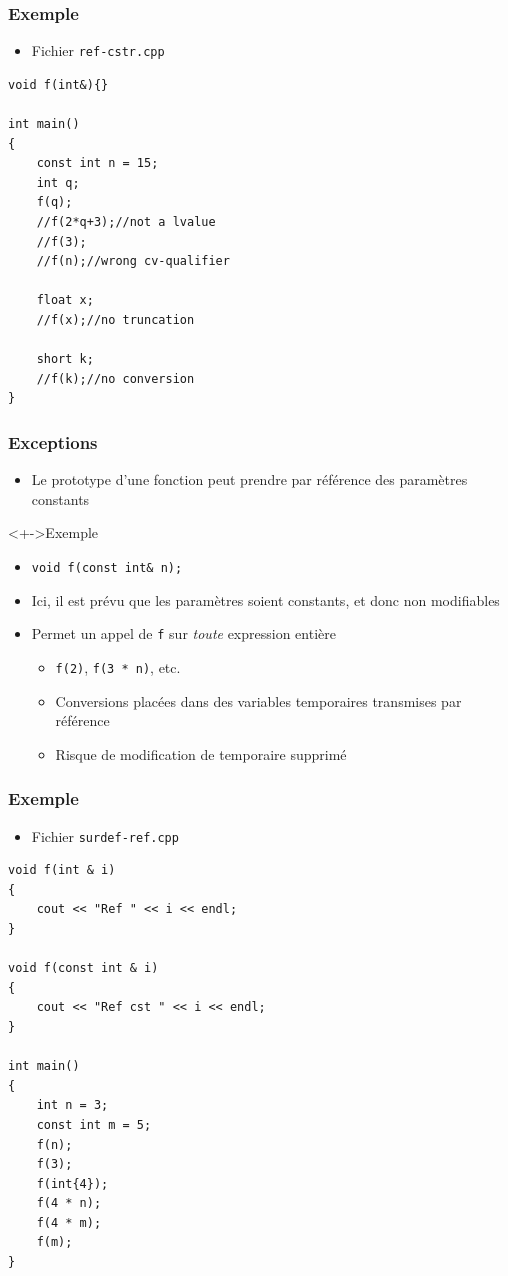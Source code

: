 \begin{frame}[containsverbatim]
\frametitle{Exemple}
\begin{itemize}
\item Fichier \texttt{ref-cstr.cpp}
\end{itemize}
\begin{lstlisting}
void f(int&){}

int main()
{
	const int n = 15;
	int q;
	f(q);
	//f(2*q+3);//not a lvalue
	//f(3);
	//f(n);//wrong cv-qualifier

	float x;
	//f(x);//no truncation

	short k;
	//f(k);//no conversion
}
\end{lstlisting}
\end{frame}

\begin{frame}
\frametitle{Exceptions}
\begin{itemize}[<+->]
\item Le prototype d'une fonction peut prendre par référence des paramètres constants
\end{itemize}
\begin{exampleblock}<+->{Exemple}
	\begin{itemize}[<+->]
	\item \lstinline|void f(const int& n);|
	\end{itemize}
\end{exampleblock}
\begin{itemize}[<+->]
\item Ici, il est prévu que les paramètres soient constants, et donc non modifiables
\item Permet un appel de \texttt{f} sur \emph{toute} expression entière
	\begin{itemize}
	\item \texttt{f(2)}, \texttt{f(3 * n)}, etc.
	\item Conversions placées dans des variables temporaires transmises par référence
	\item Risque de modification de temporaire supprimé
	\end{itemize}
\end{itemize}
\end{frame}

\begin{frame}[containsverbatim]
\frametitle{Exemple}
\begin{itemize}
\item Fichier \texttt{surdef-ref.cpp}
\end{itemize}
\begin{lstlisting}
void f(int & i)
{
	cout << "Ref " << i << endl;
}

void f(const int & i)
{
	cout << "Ref cst " << i << endl;
}

int main()
{
	int n = 3;
	const int m = 5;
	f(n);
	f(3);
	f(int{4});
	f(4 * n);
	f(4 * m);
	f(m);
}
\end{lstlisting}
\end{frame}

